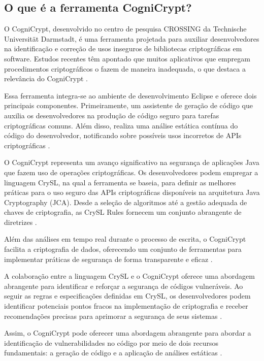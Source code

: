 \subsection{O que é a ferramenta CogniCrypt?} %

O CogniCrypt, desenvolvido no centro de pesquisa CROSSING da Technische Universität Darmstadt, é uma ferramenta projetada para auxiliar desenvolvedores na identificação e correção de usos inseguros de bibliotecas criptográficas em software. Estudos recentes têm apontado que muitos aplicativos que empregam procedimentos criptográficos o fazem de maneira inadequada, o que destaca a relevância do CogniCrypt \cite{CogniCrypt}.

Essa ferramenta integra-se ao ambiente de desenvolvimento Eclipse e oferece dois principais componentes. Primeiramente, um assistente de geração de código que auxilia os desenvolvedores na produção de código seguro para tarefas criptográficas comuns. Além disso, realiza uma análise estática contínua do código do desenvolvedor, notificando sobre possíveis usos incorretos de APIs criptográficas \cite{CogniCrypt}.

O CogniCrypt representa um avanço significativo na segurança de aplicações Java que fazem uso de operações criptográficas. Os desenvolvedores podem empregar a linguagem CrySL, na qual a ferramenta se baseia, para definir as melhores práticas para o uso seguro das APIs criptográficas disponíveis na arquitetura Java Cryptography (JCA). Desde a seleção de algoritmos até a gestão adequada de chaves de criptografia, as CrySL Rules fornecem um conjunto abrangente de diretrizes \cite{CogniCrypt}.

Além das análises em tempo real durante o processo de escrita, o CogniCrypt facilita a criptografia de dados, oferecendo um conjunto de ferramentas para implementar práticas de segurança de forma transparente e eficaz \cite{CogniCrypt}.

A colaboração entre a linguagem CrySL e o CogniCrypt oferece uma abordagem abrangente para identificar e reforçar a segurança de códigos vulneráveis. Ao seguir as regras e especificações definidas em CrySL, os desenvolvedores podem identificar potenciais pontos fracos na implementação de criptografia e receber recomendações precisas para aprimorar a segurança de seus sistemas \cite{CogniCrypt}.

Assim, o CogniCrypt pode oferecer uma abordagem abrangente para abordar a identificação de vulnerabilidades no código por meio de dois recursos fundamentais: a geração de código e a aplicação de análises estáticas \cite{CogniCrypt}.


